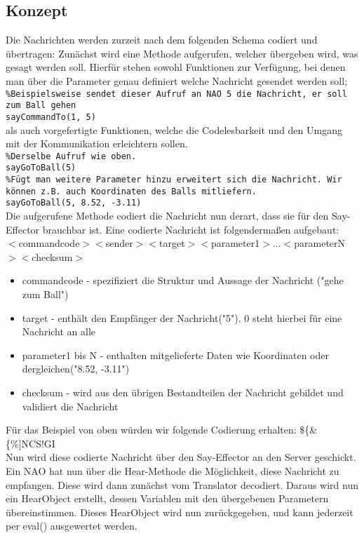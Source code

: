 \subsection{Konzept}
Die Nachrichten werden zurzeit nach dem folgenden Schema codiert und 
übertragen:
Zunächst wird eine Methode aufgerufen, welcher übergeben wird, was 
gesagt werden soll. 
Hierfür stehen sowohl Funktionen zur Verfügung, bei denen man über die 
Parameter genau definiert welche Nachricht gesendet werden soll;\\
\texttt{\%Beispielsweise sendet dieser Aufruf an NAO 5 die Nachricht, er soll zum Ball gehen\\
sayCommandTo(1, 5)}\\
als auch vorgefertigte Funktionen, welche die Codelesbarkeit und den Umgang mit der Kommunikation erleichtern sollen.\\
\texttt{\%Derselbe Aufruf wie oben.\\
sayGoToBall(5)}\\
\texttt{\%Fügt man weitere Parameter hinzu erweitert sich die Nachricht. Wir können z.B. auch Koordinaten des Balls mitliefern.\\
sayGoToBall(5, 8.52, -3.11)}\\
Die aufgerufene Methode codiert die Nachricht nun derart, dass 
sie für den Say-Effector brauchbar ist. Eine codierte Nachricht ist 
folgendermaßen aufgebaut:\\
$<$commandcode$><$sender$><$target$><$parameter1$>$...$<$parameterN$><$checksum$>$

\begin{itemize}
\item  commandcode - spezifiziert die Struktur und Aussage der Nachricht ("gehe zum Ball")
\item  target - enthält den Empfänger der Nachricht("5"). 0 steht hierbei für eine Nachricht an alle
\item  parameter1 bis N - enthalten mitgelieferte Daten wie Koordinaten oder dergleichen("8.52, -3.11")
\item  checksum - wird aus den übrigen Bestandteilen der Nachricht gebildet und validiert die Nachricht
\end{itemize}
Für das Beispiel von oben würden wir folgende Codierung erhalten: \$\{\&\{\%]NCS!GI\\
Nun wird diese codierte Nachricht über den Say-Effector an den Server geschickt.\\
Ein NAO hat nun über die Hear-Methode die Möglichkeit, diese 
Nachricht zu empfangen. Diese wird dann zunächst vom Translator 
decodiert. Daraus wird nun ein HearObject erstellt, dessen Variablen mit
 den übergebenen Parametern übereinstimmen. Dieses HearObject wird nun 
zurückgegeben, und kann jederzeit per eval() ausgewertet werden. 

